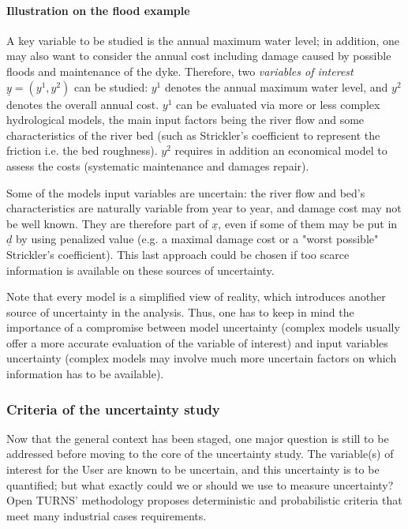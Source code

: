 \paragraph{Illustration on the flood example}
\par

A key variable to be studied is the annual maximum water level; in addition, one may also want to consider the annual cost including damage caused by possible floods and  maintenance of the dyke. Therefore, two {\em variables of interest} $\underline{y} = \left( y^1,y^2 \right)$ can be studied: $y^1$ denotes the annual maximum water level, and $y^2$ denotes the overall annual cost. $y^1$ can be evaluated via more or less complex hydrological models, the main input factors being the river flow and some characteristics of the river bed (such as Strickler's coefficient to represent the friction i.e. the bed roughness). $y^2$ requires in addition an economical model to assess the costs (systematic maintenance and damages repair).

Some of the models input variables are uncertain: the river flow and bed's characteristics are naturally variable from year to year, and damage cost may not be well known. They are therefore part of $\underline{x}$, even if some of them may be put in $\underline{d}$ by using penalized value (e.g. a maximal damage cost or a "worst possible" Strickler's coefficient). This last approach could be chosen if too scarce information is available on these sources of uncertainty.

Note that every model is a simplified view of reality, which introduces another source of uncertainty in the analysis. Thus, one has to keep in mind the importance of a compromise between model uncertainty (complex models usually offer a more accurate evaluation of the variable of interest) and input variables uncertainty (complex models may involve much more uncertain factors on which information has to be available).

\subsubsection{Criteria of the uncertainty study}

Now that the general context has been staged, one major question is still to be addressed before moving to the core of the uncertainty study. The variable(s) of interest for the User are known to be uncertain, and this uncertainty is to be quantified; but what exactly could we or should we use to measure uncertainty? Open TURNS' methodology proposes deterministic and probabilistic criteria that meet many industrial cases requirements.

